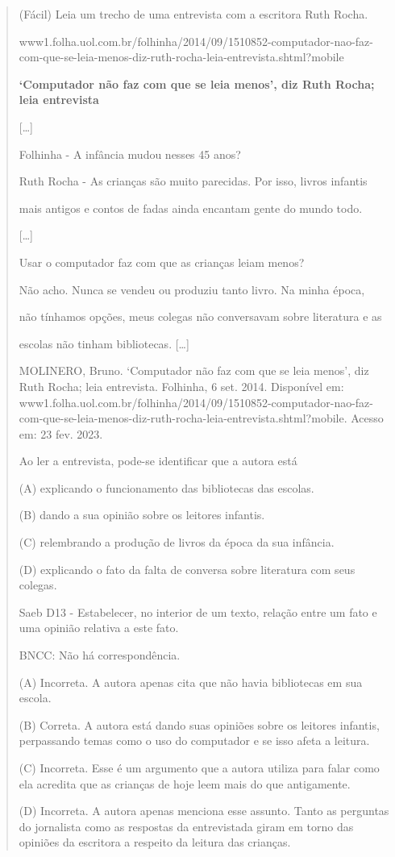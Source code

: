 \begin{quote}
(Fácil) Leia um trecho de uma entrevista com a escritora Ruth Rocha.

www1.folha.uol.com.br/folhinha/2014/09/1510852-computador-nao-faz-com-que-se-leia-menos-diz-ruth-rocha-leia-entrevista.shtml?mobile

\textbf{`Computador não faz com que se leia menos', diz Ruth Rocha; leia
entrevista}

{[}\ldots{}{]}

Folhinha - A infância mudou nesses 45 anos?

Ruth Rocha - As crianças são muito parecidas. Por isso, livros infantis

mais antigos e contos de fadas ainda encantam gente do mundo todo.

{[}\ldots{}{]}

Usar o computador faz com que as crianças leiam menos?

Não acho. Nunca se vendeu ou produziu tanto livro. Na minha época,

não tínhamos opções, meus colegas não conversavam sobre literatura e as

escolas não tinham bibliotecas. {[}\ldots{}{]}

MOLINERO, Bruno. `Computador não faz com que se leia menos', diz Ruth
Rocha; leia entrevista. Folhinha, 6 set. 2014. Disponível em:
www1.folha.uol.com.br/folhinha/2014/09/1510852-computador-nao-faz-com-que-se-leia-menos-diz-ruth-rocha-leia-entrevista.shtml?mobile.
Acesso em: 23 fev. 2023.

Ao ler a entrevista, pode-se identificar que a autora está

(A) explicando o funcionamento das bibliotecas das escolas.

(B) dando a sua opinião sobre os leitores infantis.

(C) relembrando a produção de livros da época da sua infância.

(D) explicando o fato da falta de conversa sobre literatura com seus
colegas.

Saeb D13 - Estabelecer, no interior de um texto, relação entre um fato e
uma opinião relativa a este fato.

BNCC: Não há correspondência.

(A) Incorreta. A autora apenas cita que não havia bibliotecas em sua
escola.

(B) Correta. A autora está dando suas opiniões sobre os leitores
infantis, perpassando temas como o uso do computador e se isso afeta a
leitura.

(C) Incorreta. Esse é um argumento que a autora utiliza para falar como
ela acredita que as crianças de hoje leem mais do que antigamente.

(D) Incorreta. A autora apenas menciona esse assunto. Tanto as perguntas
do jornalista como as respostas da entrevistada giram em torno das
opiniões da escritora a respeito da leitura das crianças.
\end{quote}

